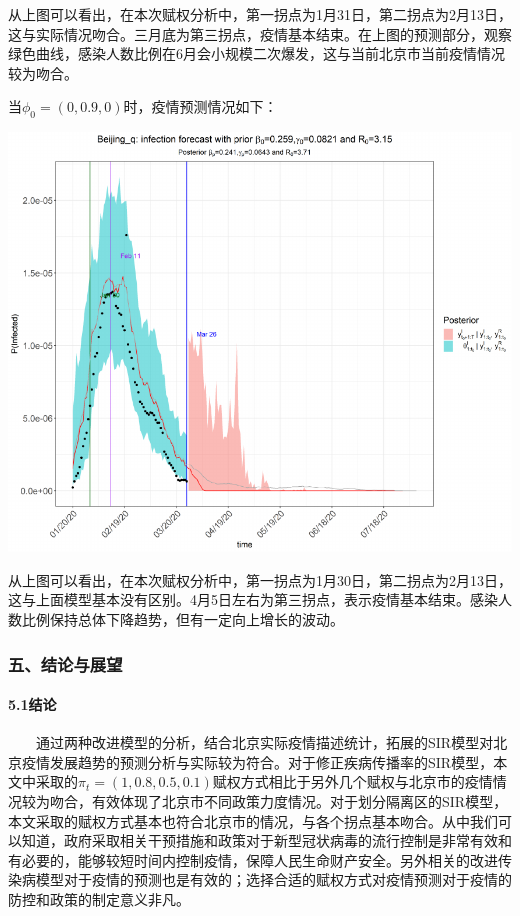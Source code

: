 \documentclass[12pt,a5paper,]{article}
\let\oldparagraph\paragraph
\renewcommand{\paragraph}[1]{\oldparagraph{#1}\mbox{}}
\begin{document}
从上图可以看出，在本次赋权分析中，第一拐点为1月31日，第二拐点为2月13日，这与实际情况吻合。三月底为第三拐点，疫情基本结束。在上图的预测部分，观察绿色曲线，感染人数比例在6月会小规模二次爆发，这与当前北京市当前疫情情况较为吻合。

当\(\phi_{0}=(0,0.9,0)\)时，疫情预测情况如下：

\includegraphics[width=50in]{figures/q21}

从上图可以看出，在本次赋权分析中，第一拐点为1月30日，第二拐点为2月13日，这与上面模型基本没有区别。4月5日左右为第三拐点，表示疫情基本结束。感染人数比例保持总体下降趋势，但有一定向上增长的波动。

\hypertarget{ux4e94ux7ed3ux8bbaux4e0eux5c55ux671b}{%
\subsubsection{五、结论与展望}\label{ux4e94ux7ed3ux8bbaux4e0eux5c55ux671b}}

\hypertarget{ux7ed3ux8bba}{%
\paragraph{5.1结论}\label{ux7ed3ux8bba}}

  通过两种改进模型的分析，结合北京实际疫情描述统计，拓展的SIR模型对北京疫情发展趋势的预测分析与实际较为符合。对于修正疾病传播率的SIR模型，本文中采取的\(\pi_{t}=(1,0.8,0.5,0.1)\)赋权方式相比于另外几个赋权与北京市的疫情情况较为吻合，有效体现了北京市不同政策力度情况。对于划分隔离区的SIR模型，本文采取的赋权方式基本也符合北京市的情况，与各个拐点基本吻合。从中我们可以知道，政府采取相关干预措施和政策对于新型冠状病毒的流行控制是非常有效和有必要的，能够较短时间内控制疫情，保障人民生命财产安全。另外相关的改进传染病模型对于疫情的预测也是有效的；选择合适的赋权方式对疫情预测对于疫情的防控和政策的制定意义非凡。
\end{document}

